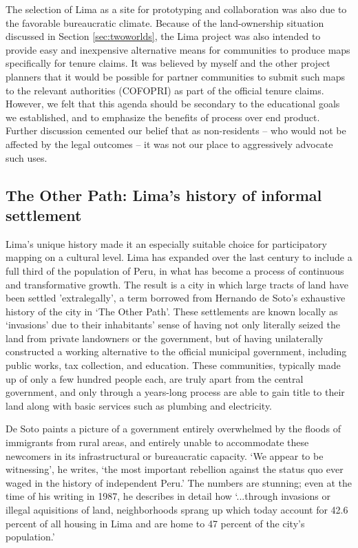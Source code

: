 \documentclass[11pt]{report}
\begin{document}
The selection of Lima as a site for prototyping and collaboration was also due to the favorable bureaucratic climate. Because of the land-ownership situation discussed in Section \ref{sec:twoworlds}, the Lima project was also intended to provide easy and inexpensive alternative means for communities to produce maps specifically for tenure claims. It was believed by myself and the other project planners that it would be possible for partner communities to submit such maps to the relevant authorities (COFOPRI) as part of the official tenure claims. However, we felt that this agenda should be secondary to the educational goals we established, and to emphasize the benefits of process over end product. Further discussion cemented our belief that as non-residents -- who would not be affected by the legal outcomes -- it was not our place to aggressively advocate such uses. 

\subsection{The Other Path: Lima's history of informal settlement}

Lima's unique history made it an especially suitable choice for participatory mapping on a cultural level. Lima has expanded over the last century to include a full third of the population of Peru, in what has become a process of continuous and transformative growth. The result is a city in which large tracts of land have been settled 'extralegally', a term borrowed from Hernando de Soto's exhaustive history of the city in `The Other Path'. These settlements are known locally as `invasions' due to their inhabitants' sense of having not only literally seized the land from private landowners or the government, but of having unilaterally constructed a working alternative to the official municipal government, including public works, tax collection, and education. These communities, typically made up of only a few hundred people each, are truly apart from the central government, and only through a years-long process are able to gain title to their land along with basic services such as plumbing and electricity.

De Soto paints a picture of a government entirely overwhelmed by the floods of immigrants from rural areas, and entirely unable to accommodate these newcomers in its infrastructural or bureaucratic capacity. `We appear to be witnessing', he writes, `the most important rebellion against the status quo ever waged in the history of independent Peru.' The numbers are stunning; even at the time of his writing in 1987, he describes in detail how `...through invasions or illegal aquisitions of land, neighborhoods sprang up which today account for 42.6 percent of all housing in Lima and are home to 47 percent of the city's population.' \cite{desoto1987sendero}
\end{document}
